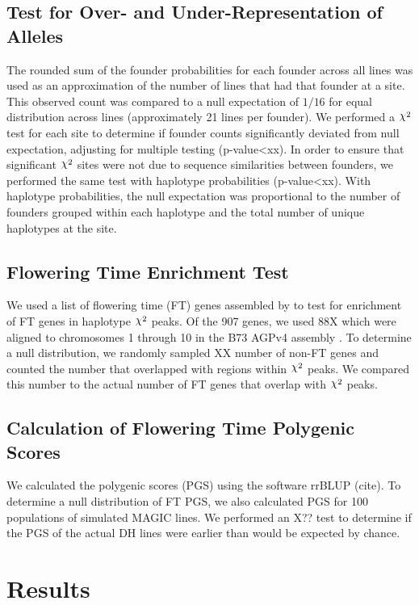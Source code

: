 \documentclass[article,9pt,twocolumn,twoside]{rilabRxiv}
\DeclareRobustCommand{\rchi}{{\mathpalette\irchi\relax}}
\newcommand{\irchi}[2]{\raisebox{\depth}{$#1\chi$}} %
\begin{document}
\subsection{Test for Over- and Under-Representation of Alleles}
The rounded sum of the founder probabilities for each founder across all lines was used as an approximation of the number of lines that had that founder at a site.
This observed count was compared to a null expectation of $1/16$ for equal distribution across lines (approximately 21 lines per founder).
We performed a $\rchi^2$ test for each site to determine if founder counts significantly deviated from null expectation, adjusting for multiple testing (p-value<xx).
In order to ensure that significant $\rchi^2$ sites were not due to sequence similarities between founders, we performed the same test with haplotype probabilities (p-value<xx).
With haplotype probabilities, the null expectation was proportional to the number of founders grouped within each haplotype and the total number of unique haplotypes at the site.

\subsection{Flowering Time Enrichment Test}
We used a list of flowering time (FT) genes assembled by \citep{Li5} to test for enrichment of FT genes in haplotype $\rchi^2$ peaks.
Of the 907 genes, we used 88X which were aligned to chromosomes 1 through 10 in the B73 AGPv4 assembly \cite{Jiao}.
To determine a null distribution, we randomly sampled XX number of non-FT genes and counted the number that overlapped with regions within $\rchi^2$ peaks.
We compared this number to the actual number of FT genes that overlap with $\rchi^2$ peaks.

\subsection{Calculation of Flowering Time Polygenic Scores}
We calculated the polygenic scores (PGS) using the software rrBLUP (cite).
To determine a null distribution of FT PGS, we also calculated PGS for 100 populations of simulated MAGIC lines.
We performed an X?? test to determine if the PGS of the actual DH lines were earlier than would be expected by chance.

\section{Results}
\end{document}
